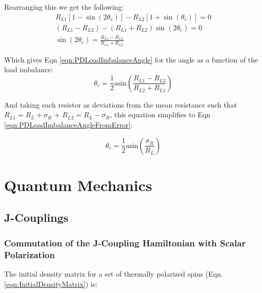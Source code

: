 \documentclass[../PaulGanssle-Thesis.tex]{subfiles}
\begin{document}
Rearranging this we get the following:
\begin{align}
\label{eqn:PDLoadImbalance1}
R_{L1}\left[1-\sin(2\theta_{e})\right] - R_{L2}\left[1 + \sin(\theta_{e})\right] = 0 \\
\label{eqn:PDLoadImbalance2}
(R_{L1} - R_{L2}) - (R_{L1} + R_{L2})\sin(2\theta_{e}) = 0 \\
\label{eqn:PDLoadImbalance3}
\sin(2\theta_{e}) = \frac{R_{L1} - R_{L2}}{R_{L1}+R_{L2}}
\end{align}

Which gives Eqn \ref{eqn:PDLoadImbalanceAngle} for the angle as a function of the load imbalance:
\begin{equation}
\label{eqn:PDLoadImbalanceAngle}
\theta_e = \frac{1}{2}\mathrm{asin}\left(\frac{R_{L1} - R_{L2}}{R_{L2} + R_{L1}}\right)
\end{equation}

And taking each resistor as deviations from the mean resistance such that $R_{L1} = R_{L} + \sigma_{R}$ + $R_{L2} = R_{L} - \sigma_{R}$, this equation simplifies to Eqn \ref{eqn:PDLoadImbalanceAngleFromError}:

\begin{equation}
\label{eqn:PDLoadImbalanceAngleFromError}
\theta_{e} = \frac{1}{2}\mathrm{asin}\left(\frac{\sigma_{R}}{R_{L}}\right)
\end{equation}

\section{Quantum Mechanics}

\subsection{J-Couplings}
\subsubsection{Commutation of the J-Coupling Hamiltonian with Scalar Polarization}
\label{proofs.qm.jcoupling.initialrhocommutation}
The initial density matrix for a set of thermally polarized spins (Eqn. \ref{eqn:InitialDensityMatrix}) is:
\end{document}
